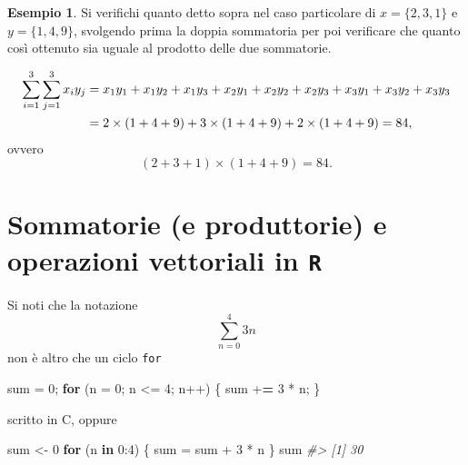 \documentclass[
]{memoir}
\newenvironment{Shaded}{\begin{snugshade}}{\end{snugshade}}
\newcommand{\AttributeTok}[1]{\textcolor[rgb]{0.77,0.63,0.00}{#1}}
\newcommand{\CommentTok}[1]{\textcolor[rgb]{0.56,0.35,0.01}{\textit{#1}}}
\newcommand{\ControlFlowTok}[1]{\textcolor[rgb]{0.13,0.29,0.53}{\textbf{#1}}}
\newcommand{\DecValTok}[1]{\textcolor[rgb]{0.00,0.00,0.81}{#1}}
\newcommand{\ErrorTok}[1]{\textcolor[rgb]{0.64,0.00,0.00}{\textbf{#1}}}
\newcommand{\NormalTok}[1]{#1}
\newcommand{\OtherTok}[1]{\textcolor[rgb]{0.56,0.35,0.01}{#1}}
\newcommand{\SpecialCharTok}[1]{\textcolor[rgb]{0.00,0.00,0.00}{#1}}
\theoremstyle{definition}
\theoremstyle{definition}
\newtheorem{example}{Esempio}[chapter]
\theoremstyle{definition}
\theoremstyle{definition}
\theoremstyle{remark}
\begin{document}
\begin{example}
Si verifichi quanto detto sopra nel caso particolare di \(x = \{2, 3, 1\}\) e \(y = \{1, 4, 9\}\), svolgendo prima la doppia sommatoria per poi verificare che quanto così ottenuto sia uguale al prodotto delle due sommatorie.

\begin{align}
\sum_{i=1}^3 \sum_{j=1}^3 x_i y_j &= x_1y_1 + x_1y_2 + x_1y_3 + 
x_2y_1 + x_2y_2 + x_2y_3 + 
x_3y_1 + x_3y_2 + x_3y_3 \notag\\
&= 2 \times (1+4+9) + 3 \times (1+4+9) + 2 \times (1+4+9) = 84,\notag
\end{align}
ovvero
\[
(2 + 3 + 1) \times (1+4+9) = 84.
\]
\end{example}

\hypertarget{sommatorie-e-produttorie-e-operazioni-vettoriali-in-r}{%
\section{\texorpdfstring{Sommatorie (e produttorie) e operazioni vettoriali in \texttt{R}}{Sommatorie (e produttorie) e operazioni vettoriali in R}}\label{sommatorie-e-produttorie-e-operazioni-vettoriali-in-r}}

Si noti che la notazione
\[
\sum_{n=0}^4 3n
\]
non è altro che un ciclo \texttt{for}

\begin{Shaded}
\begin{Highlighting}[]
\NormalTok{sum }\OtherTok{=} \DecValTok{0}\NormalTok{;}
\ControlFlowTok{for}\NormalTok{ (}\AttributeTok{n =} \DecValTok{0}\NormalTok{; n }\SpecialCharTok{\textless{}=} \DecValTok{4}\NormalTok{; n}\SpecialCharTok{++}\NormalTok{) \{}
\NormalTok{  sum }\SpecialCharTok{+}\ErrorTok{=} \DecValTok{3} \SpecialCharTok{*}\NormalTok{ n;}
\NormalTok{\}}
\end{Highlighting}
\end{Shaded}

scritto in C, oppure

\begin{Shaded}
\begin{Highlighting}[]
\NormalTok{sum }\OtherTok{\textless{}{-}} \DecValTok{0}
\ControlFlowTok{for}\NormalTok{ (n }\ControlFlowTok{in} \DecValTok{0}\SpecialCharTok{:}\DecValTok{4}\NormalTok{) \{}
\NormalTok{  sum }\OtherTok{=}\NormalTok{ sum }\SpecialCharTok{+} \DecValTok{3} \SpecialCharTok{*}\NormalTok{ n}
\NormalTok{\}}
\NormalTok{sum}
\CommentTok{\#\textgreater{} [1] 30}
\end{Highlighting}
\end{Shaded}
\end{document}
